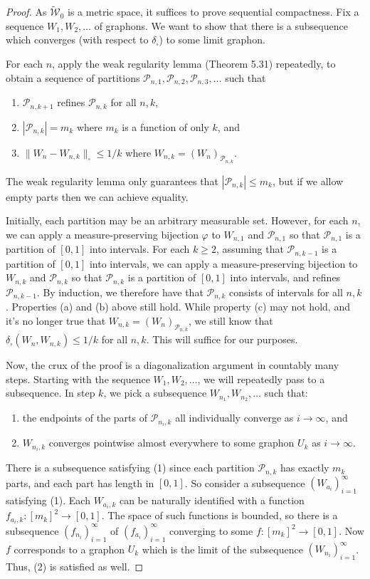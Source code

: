 \documentclass[UTF8,11pt]{ctexart}
\theoremstyle{definition}
\begin{document}
\begin{proof}
As $\widetilde{\mathcal W}_0$ is a metric space, it suffices to prove sequential compactness. Fix a sequence $W_1,W_2,\ldots$ of graphons. We want to show that there is a subsequence which converges (with respect to $\delta_\square$) to some limit graphon.

For each $n$, apply the weak regularity lemma (Theorem 5.31) repeatedly, to obtain a sequence of partitions $\mathcal P_{n,1},\mathcal P_{n,2},\mathcal P_{n,3},\ldots$ such that
\begin{enumerate}[label=(\alph*)]
\item $\mathcal P_{n,k+1}$ refines $\mathcal P_{n,k}$ for all $n,k$,
\item $|\mathcal P_{n,k}|=m_k$ where $m_k$ is a function of only $k$, and
\item $\|W_n-W_{n,k}\|_\square\leq1/k$ where $W_{n,k}=(W_n)_{\mathcal P_{n,k}}$.
\end{enumerate}
The weak regularity lemma only guarantees that $|\mathcal P_{n,k}|\leq m_k$, but if we allow empty parts then we can achieve equality.

Initially, each partition may be an arbitrary measurable set. However, for each $n$, we can apply a measure-preserving bijection $\varphi$ to $W_{n,1}$ and $\mathcal P_{n,1}$ so that $\mathcal P_{n,1}$ is a partition of $[0,1]$ into intervals. For each $k\geq2$, assuming that $\mathcal P_{n,k-1}$ is a partition of $[0,1]$ into intervals, we can apply a measure-preserving bijection to $W_{n,k}$ and $\mathcal P_{n,k}$ so that $\mathcal P_{n,k}$ is a partition of $[0,1]$ into intervals, and refines $\mathcal P_{n,k-1}$. By induction, we therefore have that $\mathcal P_{n,k}$ consists of intervals for all $n,k$. Properties (a) and (b) above still hold. While property (c) may not hold, and it's no longer true that $W_{n,k}=(W_n)_{\mathcal P_{n,k}}$, we still know that $\delta_\square(W_n,W_{n,k})\leq1/k$ for all $n,k$. This will suffice for our purposes.

Now, the crux of the proof is a diagonalization argument in countably many steps. Starting with the sequence $W_1,W_2,\ldots$, we will repeatedly pass to a subsequence. In step $k$, we pick a subsequence $W_{n_1},W_{n_2},\ldots$ such that:
\begin{enumerate}
\item the endpoints of the parts of $\mathcal P_{n_i,k}$ all individually converge as $i\to\infty$, and
\item $W_{n_i,k}$ converges pointwise almost everywhere to some graphon $U_k$ as $i\to\infty$.
\end{enumerate}
There is a subsequence satisfying (1) since each partition $\mathcal P_{n,k}$ has exactly $m_k$ parts, and each part has length in $[0,1]$. So consider a subsequence $(W_{a_i})_{i=1}^\infty$ satisfying (1). Each $W_{a_i,k}$ can be naturally identified with a function $f_{a_i,k}:[m_k]^2\to[0,1]$. The space of such functions is bounded, so there is a subsequence $(f_{n_i})_{i=1}^\infty$ of $(f_{a_i})_{i=1}^\infty$ converging to some $f:[m_k]^2\to[0,1]$. Now $f$ corresponds to a graphon $U_k$ which is the limit of the subsequence $(W_{n_i})_{i=1}^\infty$. Thus, (2) is satisfied as well.


\end{proof}
\end{document}

